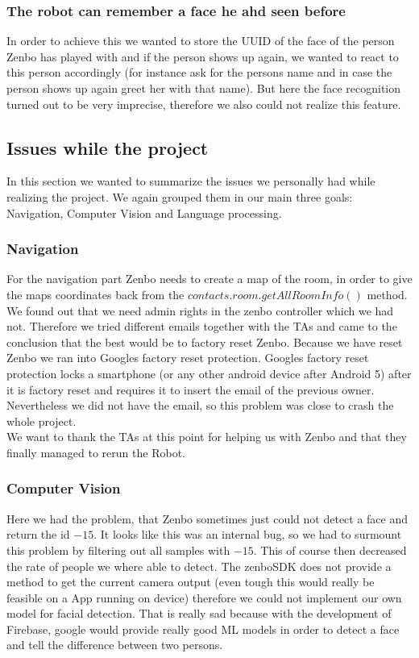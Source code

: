 \documentclass[conference]{IEEEtran}
\begin{document}
\subsubsection{The robot can remember a face he ahd seen before}
In order to achieve this we wanted to store the UUID of the face of the person Zenbo has played with and if the person shows up again, we wanted to
react to this person accordingly (for instance ask for the persons name and in case the person shows up again greet her with that name).
But here the face recognition turned out to be very imprecise, therefore we also could not realize this feature.
\subsection{Issues while the project}
In this section we wanted to summarize the issues we personally had while realizing the project. We again grouped them in our 
main three goals: Navigation, Computer Vision and Language processing.
\subsubsection{Navigation}
For the navigation part Zenbo needs to create a map of the room, in order to give the maps coordinates back from the $contacts.room.getAllRoomInfo()$ method.\\
We found out that we need admin rights in the zenbo controller which we had not. Therefore we tried different emails together with the TAs 
and came to the conclusion that the best would be to factory reset Zenbo. Because we have reset Zenbo we ran into Googles factory reset protection.
Googles factory reset protection locks a smartphone (or any other android device after Android 5) 
after it is factory reset and requires it to insert the email of the previous owner. 
Nevertheless we did not have the email, so this problem was close to crash the whole project.\\
We want to thank the TAs at this point for helping us with Zenbo and that they finally managed to rerun the Robot.
\subsubsection{Computer Vision}
Here we had the problem, that Zenbo sometimes just could not detect a face and return the id $-15$. 
It looks like this was an internal bug, so we had to surmount this problem by filtering out all samples with $-15$.
This of course then decreased the rate of people we where able to detect.
The zenboSDK does not provide a method to get the current camera output (even tough this would really be feasible on a App running on device)
therefore we could not implement our own model for facial detection. That is really sad because with the development of Firebase, google would provide
really good ML models in order to detect a face and tell the difference between two persons.
\end{document}
